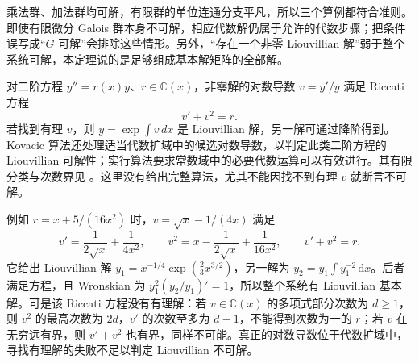 乘法群、加法群均可解，有限群的单位连通分支平凡，所以三个算例都符合准则。即使有限微分 Galois 群本身不可解，相应代数解仍属于允许的代数步骤；把条件误写成“\(G\) 可解”会排除这些情形。另外，“存在一个非零 Liouvillian 解”弱于整个系统可解，本定理说的是足够组成基本解矩阵的全部解。

\ProseParagraphBreak
对二阶方程 \(y''=r(x)y\)、\(r\in\mathbb C(x)\)，非零解的对数导数 \(v=y'/y\) 满足 Riccati 方程
\[
	v'+v^2=r.
\]
若找到有理 \(v\)，则 \(y=\exp\int v\,dx\) 是 Liouvillian 解，另一解可通过降阶得到。Kovacic 算法还处理适当代数扩域中的候选对数导数，以判定此类二阶方程的 Liouvillian 可解性；实行算法要求常数域中的必要代数运算可以有效进行。其有限分类与次数界见 \cite[Section 1.5, pp. 49--51]{Singer2009DifferentialGalois}。这里没有给出完整算法，尤其不能因找不到有理 \(v\) 就断言不可解。

\ProseParagraphBreak
例如 \(r=x+5/(16x^2)\) 时，\(v=\sqrt x-1/(4x)\) 满足
\[
	v'=\frac1{2\sqrt x}+\frac1{4x^2},\qquad v^2=x-\frac1{2\sqrt x}+\frac1{16x^2},\qquad v'+v^2=r.
\]
它给出 Liouvillian 解 \(y_1=x^{-1/4}\exp(\tfrac23x^{3/2})\)，另一解为 \(y_2=y_1\int y_1^{-2}\,\mathrm dx\)。后者满足方程，且 Wronskian 为 \(y_1^2(y_2/y_1)'=1\)，所以整个系统有 Liouvillian 基本解。可是该 Riccati 方程没有有理解：若 \(v\in\mathbb C(x)\) 的多项式部分次数为 \(d\ge1\)，则 \(v^2\) 的最高次数为 \(2d\)，\(v'\) 的次数至多为 \(d-1\)，不能得到次数为一的 \(r\)；若 \(v\) 在无穷远有界，则 \(v'+v^2\) 也有界，同样不可能。真正的对数导数位于代数扩域中，寻找有理解的失败不足以判定 Liouvillian 不可解。
